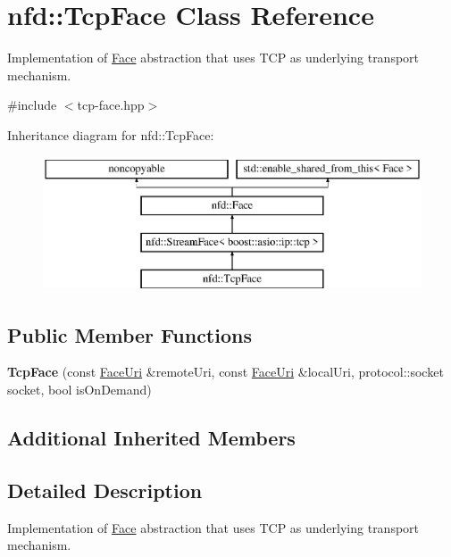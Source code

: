 \hypertarget{classnfd_1_1TcpFace}{}\section{nfd\+:\+:Tcp\+Face Class Reference}
\label{classnfd_1_1TcpFace}


Implementation of \hyperlink{classnfd_1_1Face}{Face} abstraction that uses T\+CP as underlying transport mechanism.  




{\ttfamily \#include $<$tcp-\/face.\+hpp$>$}

Inheritance diagram for nfd\+:\+:Tcp\+Face\+:\begin{figure}[H]
\begin{center}
\leavevmode
\includegraphics[height=4.000000cm]{classnfd_1_1TcpFace}
\end{center}
\end{figure}
\subsection*{Public Member Functions}
\begin{DoxyCompactItemize}
\item 
{\bfseries Tcp\+Face} (const \hyperlink{classndn_1_1util_1_1FaceUri}{Face\+Uri} \&remote\+Uri, const \hyperlink{classndn_1_1util_1_1FaceUri}{Face\+Uri} \&local\+Uri, protocol\+::socket socket, bool is\+On\+Demand)\hypertarget{classnfd_1_1TcpFace_aa8cc1ddc043d81b138f997a363baf311}{}\label{classnfd_1_1TcpFace_aa8cc1ddc043d81b138f997a363baf311}

\end{DoxyCompactItemize}
\subsection*{Additional Inherited Members}


\subsection{Detailed Description}
Implementation of \hyperlink{classnfd_1_1Face}{Face} abstraction that uses T\+CP as underlying transport mechanism. 

